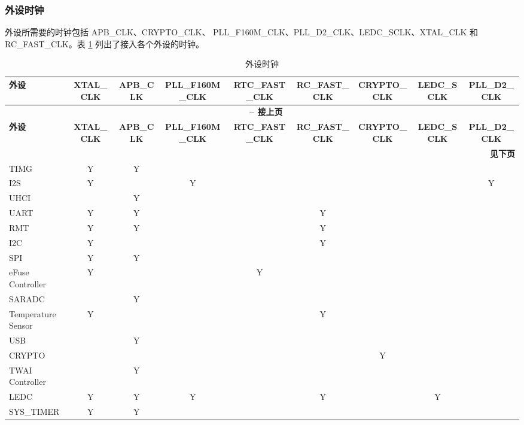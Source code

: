 \documentclass[main\_\_CN.tex]{subfiles}
\begin{document}
\subsubsection{外设时钟}
外设所需要的时钟包括 APB\_CLK、CRYPTO\_CLK、 PLL\_F160M\_CLK、PLL\_D2\_CLK、LEDC\_SCLK、XTAL\_CLK 和 RC\_FAST\_CLK。表 \ref{tab:resclk-periph-clks} 列出了接入各个外设的时钟。

\begin{landscape}
\begin{longtable}[c]{|p{2.5cm}|c|c|c|c|c|c|c|c| }
 \caption{外设时钟}
    \label{tab:resclk-periph-clks} \\
  \hline
    \rowcolor{lightgray}
        \textbf{外设} & \textbf{XTAL\_CLK} & \textbf{APB\_CLK} & \textbf{PLL\_F160M\_CLK} & \textbf{RTC\_FAST\_CLK} & \textbf{RC\_FAST\_CLK} & \textbf{CRYPTO\_CLK} &  \textbf{LEDC\_SCLK}& \textbf{PLL\_D2\_CLK} \\\hline
        \endfirsthead

    \multicolumn{9}{c}{\bfseries \tablename\ \thetable{} -- 接上页}\\\hline
    \rowcolor{lightgray}
    \textbf{外设} & \textbf{XTAL\_CLK} & \textbf{APB\_CLK} & \textbf{PLL\_F160M\_CLK} & \textbf{RTC\_FAST\_CLK} & \textbf{RC\_FAST\_CLK} & \textbf{CRYPTO\_CLK} &  \textbf{LEDC\_SCLK}& \textbf{PLL\_D2\_CLK} \\\hline
    \endhead

    \multicolumn{9}{r}{\textbf{见下页}} \\
    \endfoot
    \endlastfoot
    \hline
        TIMG & Y & Y &   &   &   & & &\\
        \hline
        I2S  & Y &   & Y &  &   & & & Y\\
        \hline
        UHCI &  & Y   &   &   &   & & &\\
        \hline
        UART & Y & Y   &   &   & Y & & &\\
        \hline
        RMT  & Y & Y   &   &   & Y & & &\\
        \hline
        I2C  & Y &   &   &   & Y & & &\\
        \hline
        SPI  & Y & Y   &   &   &   & & &\\
        \hline
        eFuse Controller &  Y &   & & Y & & & &\\
        \hline
        SARADC &   & Y    &   &   &   & & &\\
        \hline
        Temperature Sensor &  Y &     &   &   &  Y & & & \\
        \hline
        USB &   & Y    &   &   &   & & & \\
        \hline
        CRYPTO  &   &      &   &   &   &Y & &\\
        \hline
        TWAI Controller &  & Y   &  & & & & &\\
        \hline
        LEDC & Y&  Y   &Y &   &  Y & & Y &\\
        \hline
        SYS\_TIMER& Y & Y   &   &   &   & & &\\
        \hline
\end{longtable}
\end{landscape}
\end{document}
